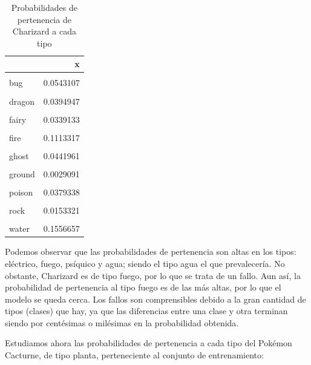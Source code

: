\documentclass[
  12pt,
]{extreport}
\begin{document}
\begin{table}[H]
\centering
\caption{Probabilidades de pertenencia de Charizard a cada tipo}
\centering
\fontsize{9}{11}\selectfont
\begin{tabular}[t]{lr}
\toprule
  & x\\
\midrule
\cellcolor{gray!10}{normal} & \cellcolor{gray!10}{0.0486216}\\
bug & 0.0543107\\
\cellcolor{gray!10}{dark} & \cellcolor{gray!10}{0.0403730}\\
dragon & 0.0394947\\
\cellcolor{gray!10}{electric} & \cellcolor{gray!10}{0.1227250}\\
\addlinespace
fairy & 0.0339133\\
\cellcolor{gray!10}{fighting} & \cellcolor{gray!10}{0.0015845}\\
fire & 0.1113317\\
\cellcolor{gray!10}{flying} & \cellcolor{gray!10}{0.0089537}\\
ghost & 0.0441961\\
\addlinespace
\cellcolor{gray!10}{grass} & \cellcolor{gray!10}{0.0962537}\\
ground & 0.0029091\\
\cellcolor{gray!10}{ice} & \cellcolor{gray!10}{0.0360089}\\
poison & 0.0379338\\
\cellcolor{gray!10}{psychic} & \cellcolor{gray!10}{0.1266588}\\
\addlinespace
rock & 0.0153321\\
\cellcolor{gray!10}{steel} & \cellcolor{gray!10}{0.0237335}\\
water & 0.1556657\\
\bottomrule
\end{tabular}
\end{table}

Podemos observar que las probabilidades de pertenencia son altas en los
tipos: eléctrico, fuego, psíquico y agua; siendo el tipo agua el que
prevalecería. No obstante, Charizard es de tipo fuego, por lo que se
trata de un fallo. Aun así, la probabilidad de pertenencia al tipo fuego
es de las más altas, por lo que el modelo se queda cerca. Los fallos son
comprensibles debido a la gran cantidad de tipos (clases) que hay, ya
que las diferencias entre una clase y otra terminan siendo por
centésimas o milésimas en la probabilidad obtenida.

Estudiamos ahora las probabilidades de pertenencia a cada tipo del
Pokémon Cacturne, de tipo planta, perteneciente al conjunto de
entrenamiento:
\end{document}
